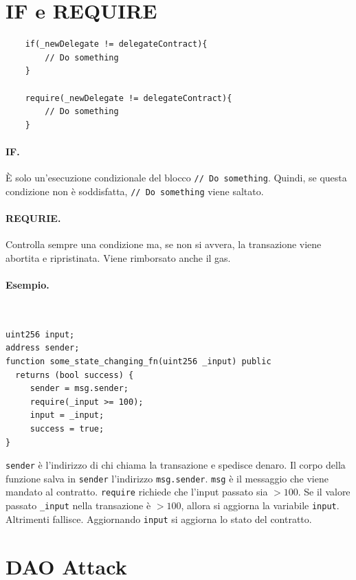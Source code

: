 \section{IF e REQUIRE}

\begin{lstlisting}
    if(_newDelegate != delegateContract){
        // Do something
    }

    require(_newDelegate != delegateContract){
        // Do something
    }
\end{lstlisting}

\paragraph{IF.}
È solo un'esecuzione condizionale del blocco \verb|// Do something|.
Quindi, se questa condizione non
è soddisfatta, \verb|// Do something| viene saltato.

\paragraph{REQURIE.}
Controlla sempre una condizione ma,
se non si avvera, la transazione viene abortita e
ripristinata. Viene rimborsato anche il gas.
\ \\
\paragraph{Esempio.}\

\begin{lstlisting}
uint256 input;
address sender;
function some_state_changing_fn(uint256 _input) public 
  returns (bool success) {
     sender = msg.sender;
     require(_input >= 100);
     input = _input;
     success = true;
}
\end{lstlisting}

\verb|sender| è l'indirizzo di chi chiama la transazione e spedisce denaro.
Il corpo della funzione salva in \verb|sender| l'indirizzo \verb|msg.sender|.
\verb|msg| è il messaggio che viene
mandato al contratto. \verb|require| richiede che l'input passato sia $ > 100$.
Se il valore passato \verb|_input| nella transazione è $ > 100$,
allora si aggiorna la variabile \verb|input|.
Altrimenti fallisce. Aggiornando \verb|input| si aggiorna lo stato del contratto.

\section{DAO Attack}

